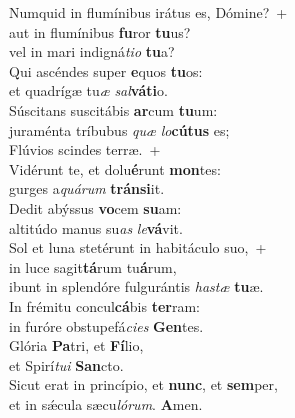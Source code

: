 \evenverse Numquid in flumínibus irátus es, Dómine?~+\\\evenverse  aut in flumínibus \textbf{fu}ror \textbf{tu}us?~\*\\
\evenverse vel in mari indigná\textit{ti}\textit{o} \textbf{tu}a?\\
\oddverse Qui ascéndes super \textbf{e}quos \textbf{tu}os:~\*\\
\oddverse et quadrígæ tu\textit{æ} \textit{sal}\textbf{vá}\textbf{ti}o.\\
\evenverse Súscitans suscitábis \textbf{ar}cum \textbf{tu}um:~\*\\
\evenverse juraménta tríbubus \textit{quæ} \textit{lo}\textbf{cú}\textbf{tus} es;\\
\oddverse Flúvios scindes terræ.~+\\
\oddverse  Vidérunt te, et dolu\textbf{é}runt \textbf{mon}tes:~\*\\
\oddverse gurges a\textit{quá}\textit{rum} \textbf{trán}\textbf{si}it.\\
\evenverse Dedit abýssus \textbf{vo}cem \textbf{su}am:~\*\\
\evenverse altitúdo manus su\textit{as} \textit{le}\textbf{vá}vit.\\
\oddverse Sol et luna stetérunt in habitáculo suo,~+\\
\oddverse  in luce sagit\textbf{tá}rum tu\textbf{á}rum,~\*\\
\oddverse ibunt in splendóre fulgurántis \textit{ha}\textit{stæ} \textbf{tu}æ.\\
\evenverse In frémitu concul\textbf{cá}bis \textbf{ter}ram:~\*\\
\evenverse in furóre obstupefá\textit{ci}\textit{es} \textbf{Gen}tes.\\
\oddverse Glória \textbf{Pa}tri, et \textbf{Fí}lio,~\*\\
\oddverse et Spirí\textit{tu}\textit{i} \textbf{San}cto.\\
\evenverse Sicut erat in princípio, et \textbf{nunc}, et \textbf{sem}per,~\*\\
\evenverse et in sǽcula sæcu\textit{ló}\textit{rum}. \textbf{A}men.\\
